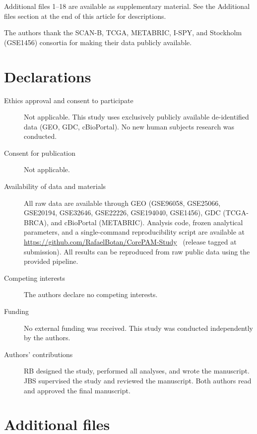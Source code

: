 \documentclass[pdflatex,sn-vancouver-num]{sn-jnl}
\begin{document}

Additional files 1--18 are available as supplementary material. See the Additional files section at the end of this article for descriptions.


The authors thank the SCAN-B, TCGA, METABRIC, I-SPY, and Stockholm (GSE1456) consortia for making their data publicly available.

\section*{Declarations}

\begin{description}
\item[Ethics approval and consent to participate] Not applicable. This study uses exclusively publicly available de-identified data (GEO, GDC, cBioPortal). No new human subjects research was conducted.
\item[Consent for publication] Not applicable.
\item[Availability of data and materials] All raw data are available through GEO (GSE96058, GSE25066, GSE20194, GSE32646, GSE22226, GSE194040, GSE1456), GDC (TCGA-BRCA), and cBioPortal (METABRIC). Analysis code, frozen analytical parameters, and a single-command reproducibility script are available at \url{https://github.com/RafaelBotan/CorePAM-Study}~\cite{botan2026} (release tagged at submission). All results can be reproduced from raw public data using the provided pipeline.
\item[Competing interests] The authors declare no competing interests.
\item[Funding] No external funding was received. This study was conducted independently by the authors.
\item[Authors' contributions] RB designed the study, performed all analyses, and wrote the manuscript. JBS supervised the study and reviewed the manuscript. Both authors read and approved the final manuscript.
\end{description}

\section*{Additional files}
\end{document}
